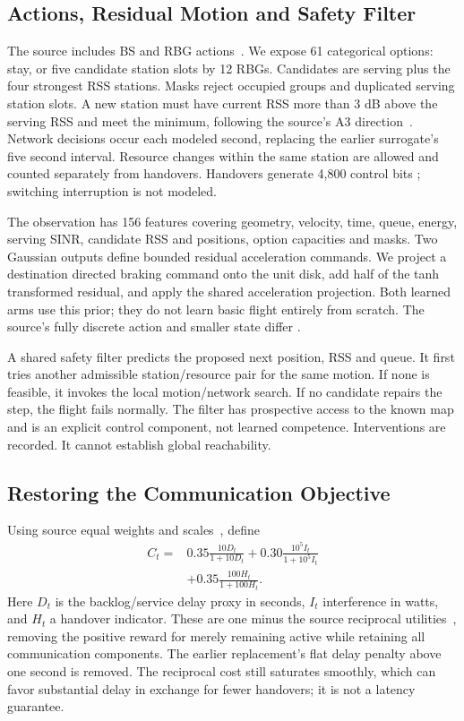 \documentclass[conference]{IEEEtran}
\begin{document}
\subsection{Actions, Residual Motion and Safety Filter}
The source includes BS and RBG actions~\cite[p.~12, Sec.~5.2]{thesis}. We expose
61 categorical options: stay, or five candidate station slots by 12 RBGs.
Candidates are serving plus the four strongest RSS stations. Masks reject
occupied groups and duplicated serving station slots. A new station must have
current RSS more than 3 dB above the serving RSS and meet the minimum, following
the source's A3 direction~\cite[p.~9, Eq.~(3); p.~15, Table~3]{thesis}.
Network decisions occur each modeled second, replacing the earlier surrogate's
five second interval. Resource changes within the same station are allowed and
counted separately from handovers. Handovers generate 4,800 control bits
\cite[p.~15, Table~3]{thesis}; switching interruption is not modeled.

The observation has 156 features covering geometry, velocity, time, queue,
energy, serving SINR, candidate RSS and positions, option capacities and masks.
Two Gaussian outputs define bounded residual acceleration commands. We project
a destination directed braking command onto the unit disk, add half of the
tanh transformed residual, and apply the shared acceleration projection. Both
learned arms use this prior; they do not learn basic flight entirely from
scratch. The source's fully discrete action and smaller state differ
\cite[p.~12, Sec.~5.2]{thesis}.

A shared safety filter predicts the proposed next position, RSS and queue. It
first tries another admissible station/resource pair for the same motion. If
none is feasible, it invokes the local motion/network search. If no candidate
repairs the step, the flight fails normally. The filter has prospective access
to the known map and is an explicit control component, not learned competence.
Interventions are recorded. It cannot establish global reachability.

\subsection{Restoring the Communication Objective}
Using source equal weights and scales~\cite[p.~15, Table~3]{thesis}, define
\begin{align}
C_t={}&0.35\frac{10D_t}{1+10D_t}
 +0.30\frac{10^5I_t}{1+10^5I_t}\nonumber\\
 &+0.35\frac{100H_t}{1+100H_t}.
\end{align}
Here $D_t$ is the backlog/service delay proxy in seconds, $I_t$ interference in
watts, and $H_t$ a handover indicator. These are one minus the source reciprocal
utilities~\cite[p.~12, Eq.~(13)]{thesis}, removing the positive reward for merely
remaining active while retaining all communication components. The earlier
replacement's flat delay penalty above one second is removed. The reciprocal
cost still saturates smoothly, which can favor substantial delay in exchange
for fewer handovers; it is not a latency guarantee.
\end{document}
